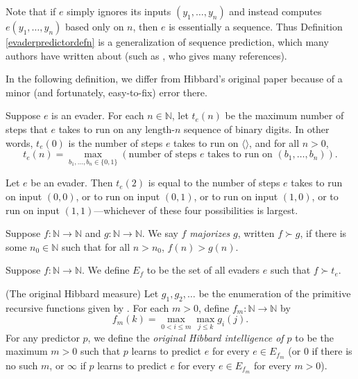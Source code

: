 \documentclass[twoside,11pt]{article}
\begin{document}
Note that if $e$ simply ignores its inputs $(y_1,\ldots,y_n)$ and instead
computes $e(y_1,\ldots,y_n)$ based only on $n$, then $e$ is essentially a sequence.
Thus Definition \ref{evaderpredictordefn} is a generalization of sequence prediction,
which many authors have written about (such as \citet{legg2006there}, who gives many
references).

In the following definition, we differ from Hibbard's original paper
because of a minor (and fortunately, easy-to-fix) error there.

\begin{definition}
\label{tsubedefinition}
    Suppose $e$ is an evader.
    For each $n\in\mathbb N$, let $t_e(n)$ be the maximum number of steps that $e$ takes
    to run on any length-$n$ sequence of binary digits.
    In other words, $t_e(0)$ is the number of steps $e$ takes to run on $\langle\rangle$,
    and for all $n>0$,
    \[
        t_e(n) = \max_{b_1,\ldots,b_n\in \{0,1\}}
        (\text{number of steps $e$ takes to run on $(b_1,\ldots,b_n)$}).
    \]
\end{definition}

\begin{example}
    Let $e$ be an evader. Then
    $t_e(2)$ is equal to the number of steps $e$ takes to run on input
    $(0,0)$, or to run on input $(0,1)$, or to run on input $(1,0)$, or to run on input
    $(1,1)$---whichever of these four possibilities is largest.
\end{example}

\begin{definition}
\label{functionsuccdefn}
    Suppose $f:\mathbb N\to\mathbb N$ and $g:\mathbb N\to\mathbb N$.
    We say $f$ \emph{majorizes} $g$, written
    $f\succ g$, if there is some $n_0\in \mathbb N$ such that for all
    $n>n_0$, $f(n)>g(n)$.
\end{definition}

\begin{definition}
\label{evadersetdefinition}
    Suppose $f:\mathbb N\to\mathbb N$. We define
    $E_f$ to be the set of all evaders $e$ such that
    $f\succ t_e$.
\end{definition}

\begin{definition}
\label{classichibbardmeasuredefn}
    (The original Hibbard measure)
    Let $g_1,g_2,\ldots$ be the enumeration of the primitive recursive
    functions given by \citet{liu1960enumeration}.
    For each $m>0$, define $f_m:\mathbb N\to\mathbb N$ by
    \[f_m(k)=\max_{0<i\leq m}\max_{j\leq k}g_i(j).\]
    For any predictor $p$, we define the \emph{original Hibbard intelligence of $p$}
    to be the maximum $m>0$
    such that $p$ learns to predict $e$ for every $e\in E_{f_m}$
    (or $0$ if there is no such $m$, or $\infty$ if $p$ learns to predict $e$
    for every $e\in E_{f_m}$ for every $m>0$).
\end{definition}
\end{document}
